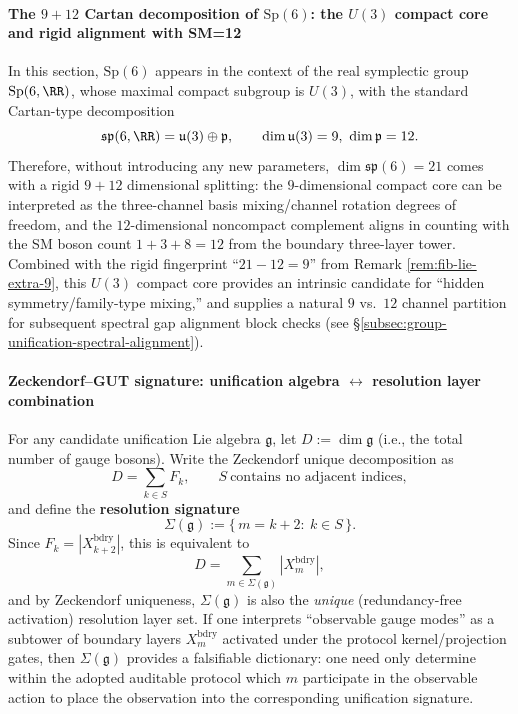 \paragraph{The $9+12$ Cartan decomposition of \texorpdfstring{$\mathrm{Sp}(6)$}{Sp(6)}: the \texorpdfstring{$U(3)$}{U(3)} compact core and rigid alignment with SM=12}
In this section, \(\mathrm{Sp}(6)\) appears in the context of the real symplectic group \(\mathrm{Sp}(6,\RR)\), whose maximal compact subgroup is \(U(3)\), with the standard Cartan-type decomposition
\[
\mathfrak{sp}(6,\RR)=\mathfrak{u}(3)\oplus \mathfrak{p},\qquad \dim\mathfrak{u}(3)=9,\ \dim\mathfrak{p}=12.
\]
Therefore, without introducing any new parameters, \(\dim\mathfrak{sp}(6)=21\) comes with a rigid \(9+12\) dimensional splitting:
the \(9\)-dimensional compact core can be interpreted as the three-channel basis mixing/channel rotation degrees of freedom,
and the \(12\)-dimensional noncompact complement aligns in counting with the SM boson count \(1+3+8=12\) from the boundary three-layer tower.
Combined with the rigid fingerprint ``\(21-12=9\)'' from Remark \ref{rem:fib-lie-extra-9},
this \(U(3)\) compact core provides an intrinsic candidate for ``hidden symmetry/family-type mixing,''
and supplies a natural \(9\) vs.\ \(12\) channel partition for subsequent spectral gap alignment block checks (see \S\ref{subsec:group-unification-spectral-alignment}).

\paragraph{Zeckendorf--GUT signature: unification algebra \texorpdfstring{$\leftrightarrow$}{<->} resolution layer combination}
For any candidate unification Lie algebra \(\mathfrak g\), let \(D:=\dim\mathfrak g\) (i.e., the total number of gauge bosons).
Write the Zeckendorf unique decomposition as
\[
D=\sum_{k\in S}F_k,\qquad S\ \text{contains no adjacent indices},
\]
and define the \textbf{resolution signature}
\[
\Sigma(\mathfrak g):=\{\,m=k+2:\ k\in S\,\}.
\]
Since \(F_k=|X^{\mathrm{bdry}}_{k+2}|\), this is equivalent to
\[
D=\sum_{m\in\Sigma(\mathfrak g)}|X_m^{\mathrm{bdry}}|,
\]
and by Zeckendorf uniqueness, \(\Sigma(\mathfrak g)\) is also the \emph{unique} (redundancy-free activation) resolution layer set.
If one interprets ``observable gauge modes'' as a subtower of boundary layers \(X_m^{\mathrm{bdry}}\) activated under the protocol kernel/projection gates,
then \(\Sigma(\mathfrak g)\) provides a falsifiable dictionary: one need only determine within the adopted auditable protocol which \(m\) participate in the observable action to place the observation into the corresponding unification signature.

